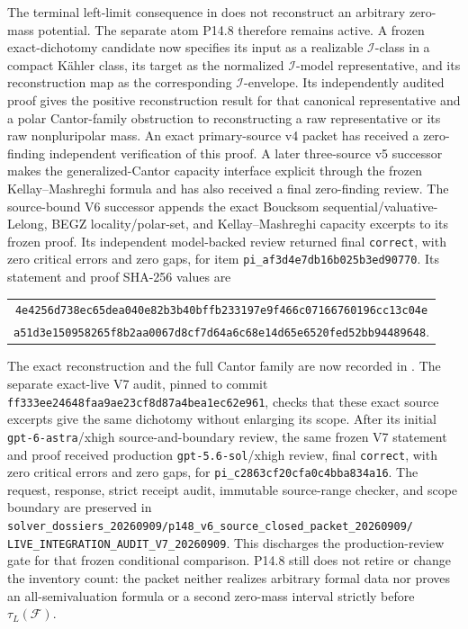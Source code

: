 The terminal left-limit consequence in
 does not reconstruct an arbitrary
zero-mass potential.  The separate atom P14.8 therefore remains active.  A
frozen exact-dichotomy candidate now specifies its input as a realizable
\(\mathcal I\)-class in a compact K\"ahler class, its target as the normalized
\(\mathcal I\)-model representative, and its reconstruction map as the
corresponding \(\mathcal I\)-envelope.  Its independently audited proof gives
the positive reconstruction result for that canonical representative and a
polar Cantor-family obstruction to reconstructing a raw representative or
its raw nonpluripolar mass.  An exact primary-source v4 packet has received a
zero-finding independent verification of this proof.  A later three-source
v5 successor makes the generalized-Cantor capacity interface explicit through
the frozen Kellay--Mashreghi formula and has also received a final
zero-finding review.  The source-bound V6 successor appends the exact
Boucksom sequential/valuative-Lelong, BEGZ locality/polar-set, and
Kellay--Mashreghi capacity excerpts to its frozen proof.  Its independent
model-backed review returned final \texttt{correct}, with zero critical
errors and zero gaps, for item
\nolinkurl{pi_af3d4e7db16b025b3ed90770}.  Its statement and proof SHA-256
values are
\begin{center}
\small
\begin{tabular}{@{}c@{}}
\nolinkurl{4e4256d738ec65dea040e82b3b40bffb233197e9f466c07166760196cc13c04e}\\
\nolinkurl{a51d3e150958265f8b2aa0067d8cf7d64a6c68e14d65e6520fed52bb94489648}.
\end{tabular}
\end{center}
The exact reconstruction and the full Cantor family are now recorded in
.  The separate
exact-live V7 audit, pinned to commit
\nolinkurl{ff333ee24648faa9ae23cf8d87a4bea1ec62e961}, checks that these
exact source excerpts give the same dichotomy without enlarging its scope.
After its initial \texttt{gpt-6-astra}/xhigh source-and-boundary review, the
same frozen V7 statement and proof received production
\texttt{gpt-5.6-sol}/xhigh review, final \texttt{correct}, with zero critical
errors and zero gaps, for \nolinkurl{pi_c2863cf20cfa0c4bba834a16}.  The
request, response, strict receipt audit, immutable source-range checker, and
scope boundary are preserved in
\nolinkurl{solver_dossiers_20260909/p148_v6_source_closed_packet_20260909/}
\nolinkurl{LIVE_INTEGRATION_AUDIT_V7_20260909}.  This discharges the
production-review gate for that frozen conditional comparison.  P14.8 still
does not retire or change the inventory count: the packet neither realizes
arbitrary formal data nor proves an all-semivaluation formula or a second
zero-mass interval strictly before \(\tau_L(\mathcal F)\).

